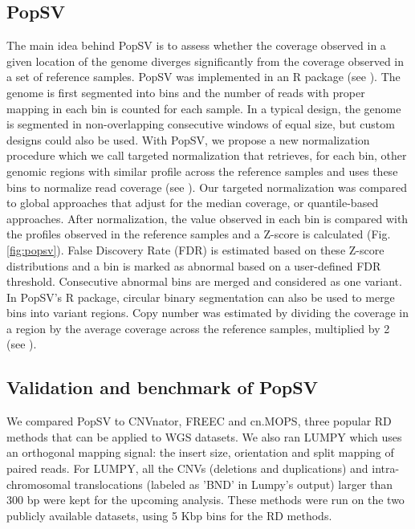 \subsection*{{\sf PopSV}}
The main idea behind {\sf PopSV} is to assess whether the coverage observed in a given location of the genome diverges significantly from the coverage observed in a set of reference samples.
{\sf PopSV} was implemented in an R package (see ).
The genome is first segmented into bins and the number of reads with proper mapping in each bin is counted for each sample.
In a typical design, the genome is segmented in non-overlapping consecutive windows of equal size, but custom designs could also be used.
With {\sf PopSV}, we propose a new normalization procedure which we call targeted normalization that retrieves, for each bin, other genomic regions with similar profile across the reference samples and uses these bins to normalize read coverage (see ).
Our targeted normalization was compared to global approaches that adjust for the median coverage, or quantile-based approaches.
After normalization, the value observed in each bin is compared with the profiles observed in the reference samples and a Z-score is calculated (Fig. \ref{fig:popsv}).
False Discovery Rate (FDR) is estimated based on these Z-score distributions and a bin is marked as abnormal based on a user-defined FDR threshold.
Consecutive abnormal bins are merged and considered as one variant.
In {\sf PopSV}'s R package, circular binary segmentation\cite{Seshan2017} can also be used to merge bins into variant regions.
Copy number was estimated by dividing the coverage in a region by the average coverage across the reference samples, multiplied by 2 (see ).

\subsection*{Validation and benchmark of {\sf PopSV}}
We compared {\sf PopSV} to {\sf CNVnator}\cite{Abyzov2011}, {\sf FREEC}\cite{Boeva2011} and {\sf cn.MOPS}\cite{Klambauer2012}, three popular RD methods that can be applied to WGS datasets.
We also ran {\sf LUMPY}\cite{Layer2012} which uses an orthogonal mapping signal: the insert size, orientation and split mapping of paired reads. For {\sf LUMPY}, all the CNVs (deletions and duplications) and intra-chromosomal translocations (labeled as 'BND' in Lumpy's output) larger than 300 bp were kept for the upcoming analysis.
These methods were run on the two publicly available datasets, using 5 Kbp bins for the RD methods.


